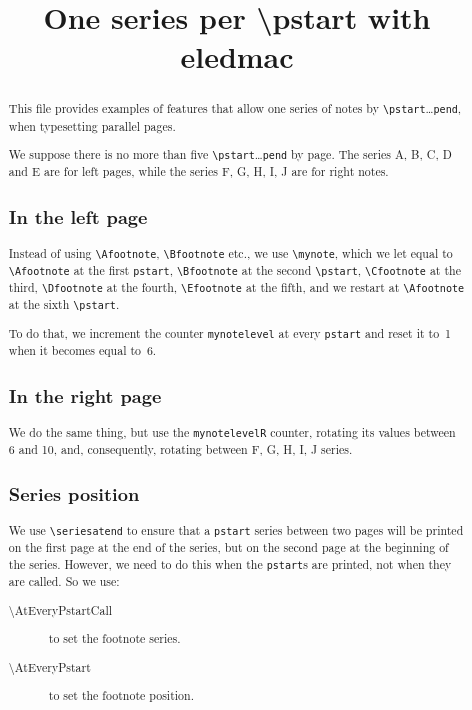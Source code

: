 \documentclass{article}
\newcounter{mynotelevel}%
\newcounter{mynotelevelR}%
\begin{document}
\title{One series per \textbackslash pstart with eledmac}
\author{}
\maketitle
\begin{abstract}
This file provides examples of features that allow one series of notes by \verb+\pstart+…\verb+pend+, when typesetting parallel pages.

We suppose there is no more than five \verb+\pstart+…\verb+pend+ by page. The series A, B, C, D and E are for left pages, while the series F, G, H, I, J are for right notes.

\subsection*{In the left page}
Instead of using \verb+\Afootnote+, \verb+\Bfootnote+ etc., we use \verb+\mynote+, which we let equal to \verb+\Afootnote+ at the first \verb+pstart+, \verb+\Bfootnote+ at the second \verb+\pstart+, \verb+\Cfootnote+ at the third, \verb+\Dfootnote+ at the fourth, \verb+\Efootnote+ at the fifth, and we restart at \verb+\Afootnote+ at the sixth \verb+\pstart+.

To do that, we increment the counter \verb+mynotelevel+ at every \verb+pstart+ and reset it to~1 when it becomes equal to~6.



\subsection*{In the right page}

We do the same thing, but use the \verb+mynotelevelR+ counter, rotating its values between 6 and 10, and, consequently, rotating between F, G, H, I, J series.

\subsection*{Series position}
We use \verb+\seriesatend+ to ensure that a \verb+pstart+ series between two pages will be printed on the first page at the end of the series, but on the second page at the beginning of the series.
However, we need to do this when the \verb+pstart+s are printed, not when they are called. So we use:
\begin{description}
  \item[\textbackslash AtEveryPstartCall] to set the footnote series.
  \item[\textbackslash AtEveryPstart] to set the footnote position.
\end{description}
\end{abstract}
\end{document}
